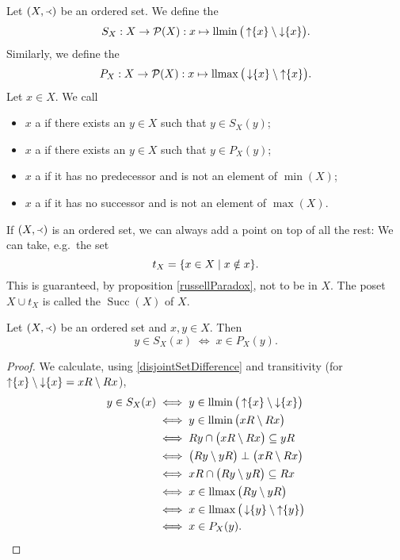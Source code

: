\begin{definition}
Let $\sSet{X,\Yleft}$ be an ordered set. We define the 
\[ S_X: X \to \operatorname{\mathcal{P}}(X): x\mapsto \operatorname{llmin}\big(\operatorname{\uparrow}\{x\}\setminus \operatorname{\downarrow}\{x\}\big). \]
Similarly, we define the 
\[ P_X: X\to \operatorname{\mathcal{P}}(X): x\mapsto \operatorname{llmax}\big(\operatorname{\downarrow}\{x\}\setminus \operatorname{\uparrow}\{x\}\big). \]
Let $x\in X$. We call
\begin{itemize}
\item $x$ a  if there exists an $y\in X$ such that $y\in S_X(y)$;
\item $x$ a  if there exists an $y\in X$ such that $y\in P_X(y)$;
\item $x$ a  if it has no predecessor and is not an element of $\min(X)$;
\item $x$ a  if it has no successor and is not an element of $\max(X)$.
\end{itemize}
\end{definition}

If $\sSet{X,\Yleft}$ is an ordered set, we can always add a point on top of all the rest: We can take, e.g.\ the set
\[ t_X = \setbuilder{x\in X}{x\notin x}. \]
This is guaranteed, by proposition \ref{russellParadox}, not to be in $X$.
The poset $X\cup t_X$ is called the  $\operatorname{Succ}(X)$ of $X$.

\begin{proposition}
Let $\sSet{X,\Yleft}$ be an ordered set and $x,y\in X$. Then
\[ y \in S_X(x) \;\iff\; x\in P_X(y). \]
\end{proposition}
\begin{proof}
We calculate, using \ref{disjointSetDifference} and transitivity (for $\operatorname{\uparrow}\{x\}\setminus \operatorname{\downarrow}\{x\} = xR\setminus Rx$),
\begin{align*}
y \in S_X(x) &\iff y\in \operatorname{llmin}\big(\operatorname{\uparrow}\{x\}\setminus \operatorname{\downarrow}\{x\}\big) \\
&\iff y\in \operatorname{llmin}\big(xR\setminus Rx\big) \\
&\iff Ry \cap \big(xR\setminus Rx\big) \subseteq yR \\
&\iff \big(Ry\setminus yR\big) \perp \big(xR\setminus Rx\big) \\
&\iff xR \cap \big(Ry\setminus yR\big) \subseteq Rx \\
&\iff x\in \operatorname{llmax}\big(Ry\setminus yR\big) \\
&\iff x\in \operatorname{llmax}\big(\operatorname{\downarrow}\{y\}\setminus \operatorname{\uparrow}\{y\}\big) \\
&\iff x \in P_X(y).
\end{align*}
\end{proof}

